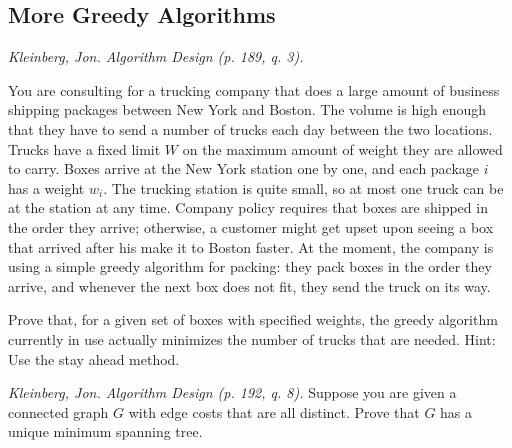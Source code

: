 \documentclass[solutionorbox,answers]{exam}
\begin{document}
\begin{center}
\end{center}
\vspace{0.1in}
 \qquad
{}

\begin{questions}

\section*{More Greedy Algorithms}

\question \textit{Kleinberg, Jon. Algorithm Design (p. 189, q. 3).}

You are consulting for a trucking company that does a large amount of
business shipping packages between New York and Boston. The volume is
high enough that they have to send a number of trucks each day between
the two locations. Trucks have a fixed limit $W$ on the maximum amount
of weight they are allowed to carry. Boxes arrive at the New York station
one by one, and each package $i$ has a weight $w_i$. The trucking station
is quite small, so at most one truck can be at the station at any time.
Company policy requires that boxes are shipped in the order they arrive;
otherwise, a customer might get upset upon seeing a box that arrived
after his make it to Boston faster. At the moment, the company is using
a simple greedy algorithm for packing: they pack boxes in the order they
arrive, and whenever the next box does not fit, they send the truck on its
way.

Prove that, for a given set of boxes with specified weights, the greedy
algorithm currently in use actually minimizes the number of trucks that
are needed. Hint: Use the stay ahead method.

\begin{solutionbox}{}

\end{solutionbox}

\newpage

\question \textit{Kleinberg, Jon. Algorithm Design (p. 192, q. 8).} Suppose you are given a connected graph $G$ with edge
costs that are all distinct. Prove that $G$ has a unique minimum spanning tree.


\end{questions}
\end{document}
